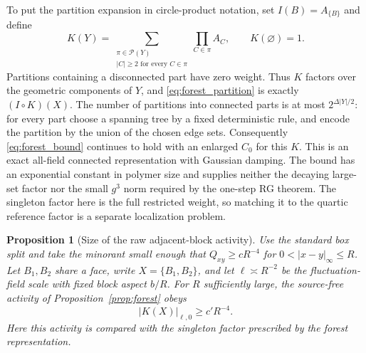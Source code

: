 \documentclass[11pt]{article}
\newtheorem{proposition}{Proposition}[section]
\begin{document}
To put the partition expansion in circle-product notation, set
\(I(B)=A_{\{B\}}\) and define
\[
 K(Y)=\sum_{\substack{\pi\in\mathcal P(Y)\\|C|\ge2\text{ for every }C\in\pi}}
                \prod_{C\in\pi}A_C,
 \qquad K(\varnothing)=1.
\]
Partitions containing a disconnected part have zero weight.
Thus \(K\) factors over the geometric components of \(Y\),
and \eqref{eq:forest_partition} is exactly \((I\circ K)(X)\).
The number of partitions into connected parts is at most
\(2^{\Delta |Y|/2}\): for every part choose a spanning tree by
a fixed deterministic rule, and encode the partition by the
union of the chosen edge sets. Consequently \eqref{eq:forest_bound}
continues to hold with an enlarged \(C_0\) for this \(K\).
This is an exact all-field connected representation with
Gaussian damping. The bound has an exponential constant in
polymer size and supplies neither the decaying large-set factor
nor the small \(g^3\) norm required by the one-step RG theorem.
The singleton factor here is the full restricted weight, so
matching it to the quartic reference factor is a separate
localization problem.

\begin{proposition}[Size of the raw adjacent-block activity]\label{prop:rawforest}
Use the standard box split and take the minorant small enough that
\(Q_{xy}\ge cR^{-4}\) for \(0<|x-y|_\infty\le R\). Let \(B_1,B_2\)
share a face, write \(X=\{B_1,B_2\}\), and let \(\ell\asymp R^{-2}\)
be the fluctuation-field scale with fixed block aspect \(b/R\).
For \(R\) sufficiently large, the source-free activity of
Proposition~\ref{prop:forest} obeys
\[
 |K(X)|_{\ell,0}\ge c'R^{-4}.
\]
Here this activity is compared with the singleton factor prescribed
by the forest representation.
\end{proposition}
\end{document}
